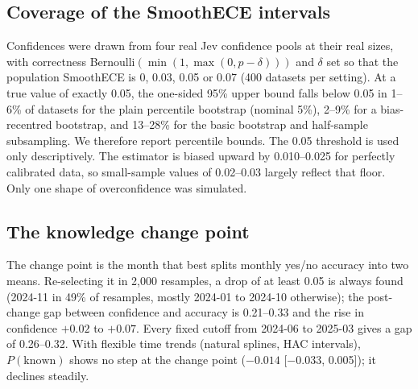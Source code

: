 \documentclass[10pt,twocolumn]{article}
\begin{document}
\subsection{Coverage of the SmoothECE intervals}
Confidences were drawn from four real Jev confidence pools at their real
sizes, with correctness Bernoulli$(\min(1,\max(0,p-\delta)))$ and $\delta$ set
so that the population SmoothECE is 0, 0.03, 0.05 or 0.07 (400 datasets per
setting). At a true value of exactly 0.05, the one-sided 95\% upper bound falls
below 0.05 in 1--6\% of datasets for the plain percentile bootstrap (nominal
5\%), 2--9\% for a bias-recentred bootstrap, and 13--28\% for the basic
bootstrap and half-sample subsampling. We therefore report percentile bounds.
The 0.05 threshold is used only descriptively. The
estimator is biased upward by 0.010--0.025 for perfectly calibrated data, so
small-sample values of 0.02--0.03 largely reflect that floor. Only one shape of
overconfidence was simulated.

\subsection{The knowledge change point}
The change point is the month that best splits monthly yes/no accuracy into two
means. Re-selecting it in 2{,}000 resamples, a drop of at least 0.05 is always
found (2024-11 in 49\% of resamples, mostly 2024-01 to 2024-10 otherwise);
the post-change gap between confidence and accuracy is 0.21--0.33 and the rise
in confidence $+0.02$ to $+0.07$. Every fixed cutoff from 2024-06 to 2025-03
gives a gap of 0.26--0.32. With flexible time trends (natural splines, HAC
intervals), $P(\text{known})$ shows no step at the change point
($-0.014$ [$-0.033$, 0.005]); it declines steadily.
\end{document}
